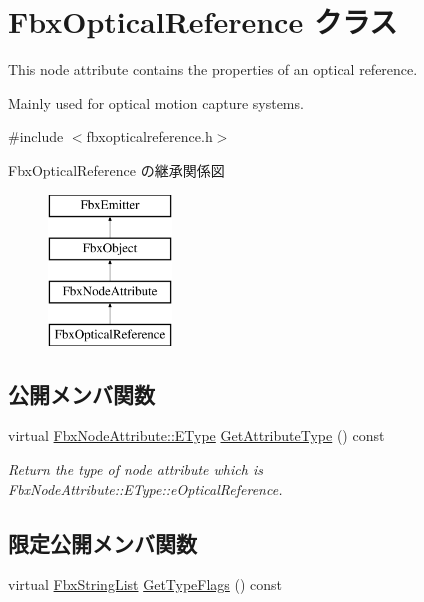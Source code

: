 \hypertarget{class_fbx_optical_reference}{}\section{Fbx\+Optical\+Reference クラス}
\label{class_fbx_optical_reference}


This node attribute contains the properties of an optical reference.

Mainly used for optical motion capture systems.  




{\ttfamily \#include $<$fbxopticalreference.\+h$>$}

Fbx\+Optical\+Reference の継承関係図\begin{figure}[H]
\begin{center}
\leavevmode
\includegraphics[height=4.000000cm]{class_fbx_optical_reference}
\end{center}
\end{figure}
\subsection*{公開メンバ関数}
\begin{DoxyCompactItemize}
\item 
virtual \hyperlink{class_fbx_node_attribute_a08e1669d3d1a696910756ab17de56d6a}{Fbx\+Node\+Attribute\+::\+E\+Type} \hyperlink{class_fbx_optical_reference_ac2c1840cbfffb236bd3b9fe49d797e12}{Get\+Attribute\+Type} () const
\begin{DoxyCompactList}\small\item\em Return the type of node attribute which is Fbx\+Node\+Attribute\+::\+E\+Type\+::e\+Optical\+Reference. \end{DoxyCompactList}\end{DoxyCompactItemize}
\subsection*{限定公開メンバ関数}
\begin{DoxyCompactItemize}
\item 
virtual \hyperlink{class_fbx_string_list}{Fbx\+String\+List} \hyperlink{class_fbx_optical_reference_ad45da7e49810bea40ff29fdaf0ca9b0b}{Get\+Type\+Flags} () const
\end{DoxyCompactItemize}
